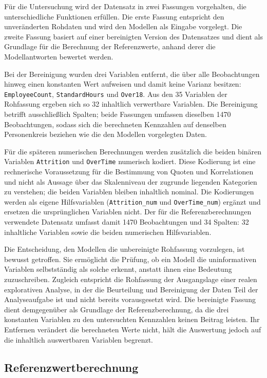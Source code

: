 Für die Untersuchung wird der Datensatz in zwei Fassungen vorgehalten, die unterschiedliche Funktionen erfüllen. Die erste Fassung entspricht den unveränderten Rohdaten und wird den Modellen als Eingabe vorgelegt. Die zweite Fassung basiert auf einer bereinigten Version des Datensatzes und dient als Grundlage für die Berechnung der Referenzwerte, anhand derer die Modellantworten bewertet werden.

Bei der Bereinigung wurden drei Variablen entfernt, die über alle Beobachtungen hinweg einen konstanten Wert aufweisen und damit keine Varianz besitzen: \texttt{EmployeeCount}, \texttt{StandardHours} und \texttt{Over18}. Aus den 35 Variablen der Rohfassung ergeben sich so 32 inhaltlich verwertbare Variablen. Die Bereinigung betrifft ausschließlich Spalten; beide Fassungen umfassen dieselben 1470 Beobachtungen, sodass sich die berechneten Kennzahlen auf denselben Personenkreis beziehen wie die den Modellen vorgelegten Daten.

Für die späteren numerischen Berechnungen werden zusätzlich die beiden binären Variablen \texttt{Attrition} und \texttt{OverTime} numerisch kodiert. Diese Kodierung ist eine rechnerische Voraussetzung für die Bestimmung von Quoten und Korrelationen und nicht als Aussage über das Skalenniveau der zugrunde liegenden Kategorien zu verstehen; die beiden Variablen bleiben inhaltlich nominal. Die Kodierungen werden als eigene Hilfsvariablen (\texttt{Attrition\_num} und \texttt{OverTime\_num}) ergänzt und ersetzen die ursprünglichen Variablen nicht. Der für die Referenzberechnungen verwendete Datensatz umfasst damit 1470 Beobachtungen und 34 Spalten: 32 inhaltliche Variablen sowie die beiden numerischen Hilfsvariablen.

Die Entscheidung, den Modellen die unbereinigte Rohfassung vorzulegen, ist bewusst getroffen. Sie ermöglicht die Prüfung, ob ein Modell die uninformativen Variablen selbstständig als solche erkennt, anstatt ihnen eine Bedeutung zuzuschreiben. Zugleich entspricht die Rohfassung der Ausgangslage einer realen explorativen Analyse, in der die Beurteilung und Bereinigung der Daten Teil der Analyseaufgabe ist und nicht bereits vorausgesetzt wird. Die bereinigte Fassung dient demgegenüber als Grundlage der Referenzberechnung, da die drei konstanten Variablen zu den untersuchten Kennzahlen keinen Beitrag leisten. Ihr Entfernen verändert die berechneten Werte nicht, hält die Auswertung jedoch auf die inhaltlich auswertbaren Variablen begrenzt.

\subsection{Referenzwertberechnung}
\label{subsec:referenzwerte}

